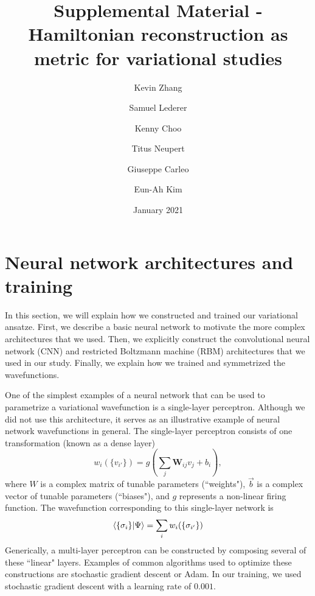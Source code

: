 \documentclass[amsmath,amssymb,aps,prb,superscriptaddress,onecolumn,floatfix]{revtex4}
\begin{document}
\title{Supplemental Material - Hamiltonian reconstruction as metric for variational studies}
\author{Kevin Zhang}
\author{Samuel Lederer}
\author{Kenny Choo}
\author{Titus Neupert}
\author{Giuseppe Carleo}
\author{Eun-Ah Kim}
\date{January 2021}


\maketitle

\section{Neural network architectures and training}
\label{sec:wf}

In this section, we will explain how we constructed and trained our variational ansatze.
First, we describe a basic neural network to motivate the more complex architectures that we used.
Then, we explicitly construct the convolutional neural network (CNN) and restricted Boltzmann machine (RBM) architectures that we used in our study.
Finally, we explain how we trained and symmetrized the wavefunctions.

One of the simplest examples of a neural network that can be used to parametrize a variational wavefunction is a single-layer perceptron.
Although we did not use this architecture, it serves as an illustrative example of neural network wavefunctions in general.
The single-layer perceptron consists of one transformation (known as a dense layer)
\begin{equation}
    w_i(\{ v_{i'} \}) = g\left(\sum_j \bm{W}_{ij} v_j + b_i\right),
\end{equation}
where $W$ is a complex matrix of tunable parameters (``weights"), $\vec{b}$ is a complex vector of tunable parameters (``biases"), and $g$ represents a non-linear firing function.
The wavefunction corresponding to this single-layer network is
\begin{equation}
    \bra{\{\sigma_i\}}\ket{\Psi} = \sum_i w_i(\{ \sigma_{i'} \})
\end{equation}
Generically, a multi-layer perceptron can be constructed by composing several of these ``linear" layers.
Examples of common algorithms used to optimize these constructions are stochastic gradient descent or Adam.
In our training, we used stochastic gradient descent with a learning rate of $0.001$.
\end{document}
